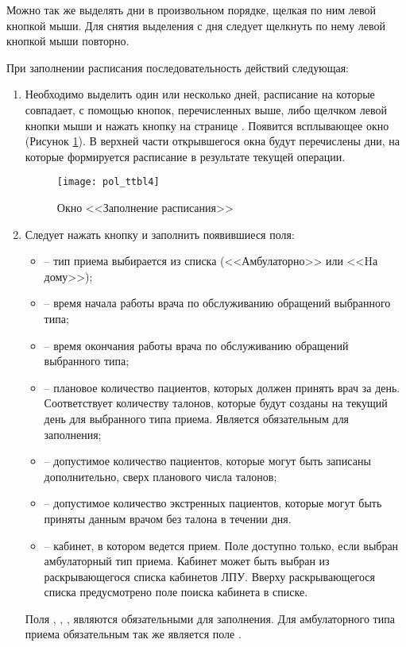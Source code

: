 Можно так же выделять дни в произвольном порядке, щелкая по ним левой кнопкой мыши. Для снятия выделения с дня следует щелкнуть по нему левой кнопкой мыши повторно.


При заполнении расписания последовательность действий следующая: 
\begin{enumerate}
 \item \label{n2} Необходимо выделить один или несколько дней, расписание на которые совпадает, с помощью кнопок, перечисленных выше, либо щелчком левой кнопки мыши и нажать кнопку  на странице . Появится всплывающее окно  (Рисунок \ref{img_pol_ttbl4}). В верхней части открывшегося окна будут перечислены дни, на которые формируется расписание в результате текущей операции. 

 \begin{figure}[ht]\centering
  \texttt{[image: pol\_ttbl4]}
  \caption{Окно <<Заполнение расписания>>}
  \label{img_pol_ttbl4}
 \end{figure}

 \item \label{n1} Следует нажать кнопку  и заполнить появившиеся поля:
 \begin{itemize}
  \item {} -- тип приема выбирается из списка (<<Амбулаторно>> или <<Hа дому>>);
  \item {} -- время начала работы врача по обслуживанию обращений выбранного типа;
  \item {} -- время окончания работы врача по обслуживанию обращений выбранного типа;
  \item {} -- плановое количество пациентов, которых должен принять врач за день. Соответствует количеству талонов, которые будут созданы на текущий день для выбранного типа приема. Является обязательным для заполнения;
  \item {} -- допустимое количество пациентов, которые могут быть записаны дополнительно, сверх планового числа талонов;
  \item {} -- допустимое количество экстренных пациентов, которые могут быть приняты данным врачом без талона в течении дня.
  \item {} -- кабинет, в котором ведется прием. Поле доступно только, если выбран амбулаторный тип приема. Кабинет может быть выбран из раскрывающегося списка кабинетов ЛПУ. Вверху раскрывающегося списка предусмотрено поле поиска кабинета в списке.
 \end{itemize}
 Поля , , ,  являются обязательными для заполнения.  Для амбулаторного типа приема обязательным так же является поле .


\end{enumerate}
